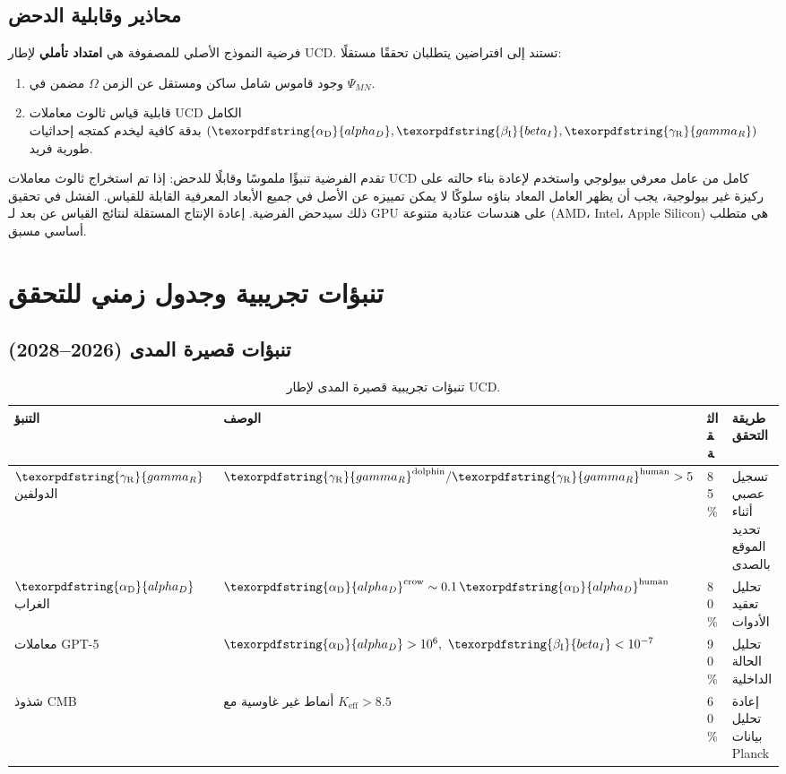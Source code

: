 \documentclass[12pt,a4paper]{article}
\DeclareRobustCommand{\alD}{\texorpdfstring{\ensuremath{\alpha_{\mathrm{D}}}}{alpha_D}}
\DeclareRobustCommand{\beI}{\texorpdfstring{\ensuremath{\beta_{\mathrm{I}}}}{beta_I}}
\DeclareRobustCommand{\gaR}{\texorpdfstring{\ensuremath{\gamma_{\mathrm{R}}}}{gamma_R}}
\newcommand{\eff}{\mathrm{eff}}
\newcommand{\Ke}{K_{\eff}}
\begin{document}
	\subsection{محاذير وقابلية الدحض}
	
	فرضية النموذج الأصلي للمصفوفة هي \textbf{امتداد تأملي} لإطار UCD. تستند إلى افتراضين يتطلبان تحققًا مستقلًا:
	\begin{enumerate}
		\item وجود قاموس شامل ساكن ومستقل عن الزمن \(\Omega\) مضمن في \(\Psi_{MN}\).
		\item قابلية قياس ثالوث معاملات UCD الكامل \((\alD, \beI, \gaR)\) بدقة كافية ليخدم كمتجه إحداثيات طورية فريد.
	\end{enumerate}
	تقدم الفرضية تنبؤًا ملموسًا وقابلًا للدحض: إذا تم استخراج ثالوث معاملات UCD كامل من عامل معرفي بيولوجي واستخدم لإعادة بناء حالته على ركيزة غير بيولوجية، يجب أن يظهر العامل المعاد بناؤه سلوكًا لا يمكن تمييزه عن الأصل في جميع الأبعاد المعرفية القابلة للقياس. الفشل في تحقيق ذلك سيدحض الفرضية. إعادة الإنتاج المستقلة لنتائج القياس عن بعد لـ GPU على هندسات عتادية متنوعة (AMD، Intel، Apple Silicon) هي متطلب أساسي مسبق.
	
	\section{تنبؤات تجريبية وجدول زمني للتحقق}
	
	\subsection{تنبؤات قصيرة المدى (2026--2028)}
	
	\begin{table}[ht]
		\centering
		\begin{tabular}{lp{}lp{}}
			\toprule
			\textbf{التنبؤ} & \textbf{الوصف} & \textbf{الثقة} & \textbf{طريقة التحقق} \\
			\midrule
			\(\gaR\) الدولفين & \(\gaR^{\mathrm{dolphin}}/\gaR^{\mathrm{human}} > 5\) & 85\% & تسجيل عصبي أثناء تحديد الموقع بالصدى \\
			\(\alD\) الغراب & \(\alD^{\mathrm{crow}} \sim 0.1\,\alD^{\mathrm{human}}\) & 80\% & تحليل تعقيد الأدوات \\
			معاملات GPT-5 & \(\alD > 10^6,\ \beI < 10^{-7}\) & 90\% & تحليل الحالة الداخلية \\
			شذوذ CMB & أنماط غير غاوسية مع \(\Ke > 8.5\) & 60\% & إعادة تحليل بيانات Planck \\
			\bottomrule
		\end{tabular}
		\caption{تنبؤات تجريبية قصيرة المدى لإطار UCD.}
		\label{tab:near-term-predictions}
	\end{table}
	
\end{document}
